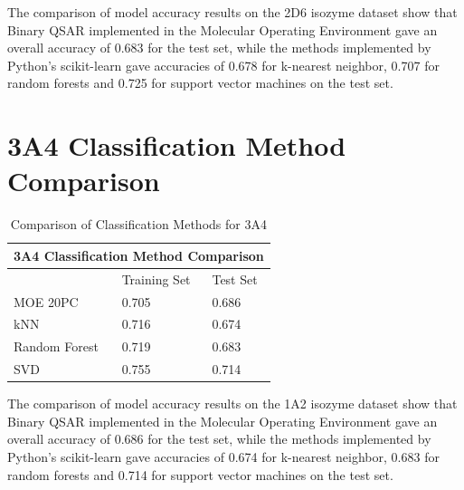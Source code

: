 The comparison of model accuracy results on the 2D6 isozyme dataset show that Binary QSAR implemented in the Molecular Operating Environment gave an overall accuracy of 0.683 for the test set, while the methods implemented by Python's scikit-learn gave accuracies of 0.678 for k-nearest neighbor, 0.707 for random forests and 0.725 for support vector machines on the test set.


\section{3A4 Classification Method Comparison}

\begin{table}[!htbp]
\begin{tabular}{|l|l|l|}
\hline
\multicolumn{3}{|c|}{3A4 Classification Method Comparison} \\ \hline
          & Training Set & Test Set \\ \hline
MOE 20PC  & 0.705        & 0.686    \\ \hline
kNN       & 0.716        & 0.674    \\ \hline
Random Forest & 0.719    & 0.683    \\ \hline
SVD       & 0.755        & 0.714    \\ \hline
\end{tabular}
\caption{Comparison of Classification Methods for 3A4}
\end{table}

The comparison of model accuracy results on the 1A2 isozyme dataset show that Binary QSAR implemented in the Molecular Operating Environment gave an overall accuracy of 0.686 for the test set, while the methods implemented by Python's scikit-learn gave accuracies of 0.674 for k-nearest neighbor, 0.683 for random forests and 0.714 for support vector machines on the test set.


